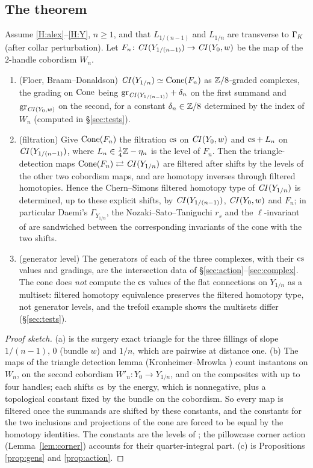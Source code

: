 \subsection{The theorem}
\begin{theorem}\label{thm:cone}
Assume \ref{H:alex}--\ref{H:Y}, $n\ge1$, and that $L_{1/(n-1)}$ and $L_{1/n}$ are transverse to $\Gamma_K$ (after collar
perturbation).  Let $F_n\colon\mathit{CI}(Y_{1/(n-1)})\to\mathit{CI}(Y_0,w)$ be the map of the $2$-handle cobordism $W_n$.
\begin{enumerate}[label=(\alph*)]
\item \textup{(Floer, Braam--Donaldson)} $\mathit{CI}(Y_{1/n})\simeq\operatorname{Cone}(F_n)$ as $\mathbb{Z}/8$-graded complexes, the grading on
$\operatorname{Cone}$ being $\mathrm{gr}_{\mathit{CI}(Y_{1/(n-1)})}+\delta_n$ on the first summand and $\mathrm{gr}_{\mathit{CI}(Y_0,w)}$ on the second, for a
constant $\delta_n\in\mathbb{Z}/8$ determined by the index of $W_n$ \textup{(}computed in \S\ref{sec:tests}\textup{)}.
\item \textup{(filtration)} Give $\operatorname{Cone}(F_n)$ the filtration $\mathrm{cs}$ on $\mathit{CI}(Y_0,w)$ and $\mathrm{cs}+L_n$ on
$\mathit{CI}(Y_{1/(n-1)})$, where $L_n\in\tfrac14\mathbb{Z}-\eta_n$ is the level of $F_n$.  Then the triangle-detection maps
$\operatorname{Cone}(F_n)\rightleftarrows\mathit{CI}(Y_{1/n})$ are filtered after shifts by the levels of the other two cobordism maps,
and are homotopy inverses through filtered homotopies.  Hence the Chern--Simons filtered homotopy type of
$\mathit{CI}(Y_{1/n})$ is determined, up to these explicit shifts, by $\mathit{CI}(Y_{1/(n-1)})$, $\mathit{CI}(Y_0,w)$ and $F_n$; in
particular Daemi's $\Gamma_{Y_{1/n}}$, the Nozaki--Sato--Taniguchi $r_s$ and the $\ell$-invariant of \cite{DLM} are
sandwiched between the corresponding invariants of the cone with the two shifts.
\item \textup{(generator level)} The generators of each of the three complexes, with their $\mathrm{cs}$ values and gradings,
are the intersection data of \S\ref{sec:action}--\ref{sec:complex}.  The cone does \emph{not} compute the
$\mathrm{cs}$ values of the flat connections on $Y_{1/n}$ as a multiset: filtered homotopy equivalence preserves the filtered
homotopy type, not generator levels, and the trefoil example shows the multisets differ (\S\ref{sec:tests}).
\end{enumerate}
\end{theorem}
\begin{proof}[Proof sketch]
(a) is the surgery exact triangle for the three fillings of slope $1/(n-1)$, $0$ (bundle $w$) and $1/n$, which
are pairwise at distance one.  (b) The maps of the triangle detection lemma (Kronheimer--Mrowka
\cite[\S7]{KM-unknot}) count instantons on $W_n$, on the second cobordism $W'_n\colon Y_0\to Y_{1/n}$, and on the
composites with up to four handles; each shifts $\mathrm{cs}$ by the energy, which is nonnegative, plus a topological
constant fixed by the bundle on the cobordism.  So every map is filtered once the summands are shifted by these
constants, and the constants for the two inclusions and projections of the cone are forced to be equal by the
homotopy identities.  The constants are the levels of \cite[Prop.~3.4]{DLM}; the pillowcase corner action (Lemma~\ref{lem:corner}) accounts for
their quarter-integral part.  (c) is Propositions \ref{prop:gens} and \ref{prop:action}.
\end{proof}
